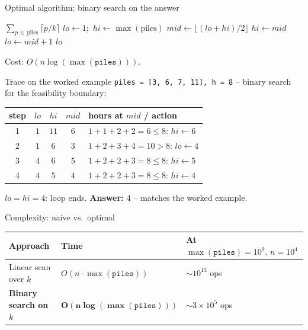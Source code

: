 \documentclass[11pt,aspectratio=169]{beamer}
\begin{document}
\begin{frame}{Optimal algorithm: binary search on the answer}
  \footnotesize
  \begin{algorithmic}[1]
      \State \Return $\sum_{p\,\in\,\text{piles}} \lceil p / k \rceil$
    \EndFunction
      \State $lo \gets 1$;\ $hi \gets \max(\text{piles})$
        \State $mid \gets \lfloor (lo+hi)/2 \rfloor$
          \State $hi \gets mid$ 
        \Else
          \State $lo \gets mid+1$ 
        \EndIf
      \EndWhile
      \State \Return $lo$
    \EndFunction
  \end{algorithmic}
  Cost: $O(n \log(\max(\texttt{piles})))$.
\end{frame}

\begin{frame}{Trace on the worked example}
  \small
  \texttt{piles = [3, 6, 7, 11], h = 8} -- binary search for the feasibility boundary:
  \begin{center}
  \begin{tabular}{@{}ccccl@{}}
    \toprule
    step & $lo$ & $hi$ & $mid$ & hours at $mid$ / action \\
    \midrule
    1 & $1$ & $11$ & $6$ & $1{+}1{+}2{+}2{=}6 \le 8$: $hi \gets 6$ \\
    2 & $1$ & $6$ & $3$ & $1{+}2{+}3{+}4{=}10 > 8$: $lo \gets 4$ \\
    3 & $4$ & $6$ & $5$ & $1{+}2{+}2{+}3{=}8 \le 8$: $hi \gets 5$ \\
    4 & $4$ & $5$ & $4$ & $1{+}2{+}2{+}3{=}8 \le 8$: $hi \gets 4$ \\
    \bottomrule
  \end{tabular}
  \end{center}
  $lo = hi = 4$: loop ends. \textbf{Answer: $4$} -- matches the worked example.
\end{frame}

\begin{frame}{Complexity: naive vs.\ optimal}
  \begin{center}
  \begin{tabular}{@{}lll@{}}
    \toprule
    Approach & Time & At $\max(\texttt{piles})=10^9,\,n=10^4$ \\
    \midrule
    Linear scan over $k$ & $O(n \cdot \max(\texttt{piles}))$ & $\sim 10^{13}$ ops \\
    \textbf{Binary search on $k$} & $\boldsymbol{O(n \log(\max(\texttt{piles})))}$ &
    $\sim 3\times 10^5$ ops \\
    \bottomrule
  \end{tabular}
  \end{center}
\end{frame}
\end{document}
